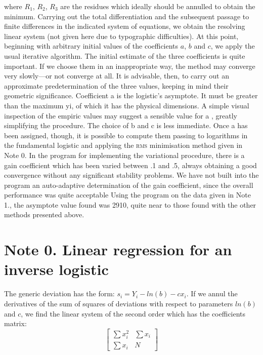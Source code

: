 \documentclass[%
 aip,
 jmp,%
 amsmath,amssymb,
 reprint,%
]{revtex4-1}
\begin{document}
where $R_1$, $R_2$, $R_3$ are the residues which ideally should be annulled to obtain the minimum.
Carrying out the total differentiation and the subsequent passage to finite differences in the indicated  system of equations, we obtain  the resolving linear  system (not  given here due to typographic difficulties). At this point, beginning with arbitrary initial values of the coefficients $a$, $b$ and $c$, we apply the usual iterative algorithm. The initial estimate of the three coefficients is quite important. If we choose them in an inappropriate way, the method may converge very slowly---or not converge at all.
It is advisable, then, to carry out an approximate predetermination  of the  three  values,  keeping  in  mind  their  geometric   significance. Coefficient  a  is the logistic's asymptote. It must be greater than the maximum  yi, of which  it has the physical dimensions.  A simple  visual inspection of the empiric values may suggest a  sensible value for  a  , greatly simplifying the procedure.
The choice of  b  and  c is less immediate. Once  a  has been  assigned, though, it is  possible to  compute them passing  to logarithms  in  the fundamental logistic and applying the  \textsc{rms} minimisation method given  in Note 0.
In the program for implementing  the variational procedure,  there is  a gain coefficient which  has been  varied between   .1  and	.5,  always obtaining a good convergence without any significant stability problems. We have not built into the program an auto-adaptive determination of  the gain  coefficient,  since the overall  performance was quite  acceptable Using the program  on the  data given in  Note 1.,  the asymptote  value found was   2910,  quite near  to  those found  with the  other  methods presented above.

\newpage

\section{\label{sec:level1}Note 0. Linear regression for an inverse logistic}

The generic deviation has the form: $s_i = Y_i - ln(b) - c x_i$. If we annul the derivatives of the sum of squares  of deviations with respect to parameters $ln(b)$ and $c$, we find the linear system of the second order which has the coefficients matrix:
\[
\begin{bmatrix}
  \sum x_i^2 &  \sum x_i \\
  \sum x_i & N
\end{bmatrix}
\]
\end{document}
